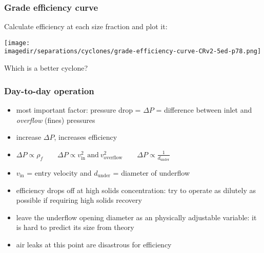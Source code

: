 \begin{frame}\frametitle{Grade efficiency curve}
	Calculate efficiency at each size fraction and plot it:
	\begin{center}
		\texttt{[image: \\imagedir/separations/cyclones/grade-efficiency-curve-CRv2-5ed-p78.png]}
	\end{center}
	Which is a better cyclone?
\end{frame}

\begin{frame}\frametitle{Day-to-day operation}
	\begin{itemize}
		\item	most important factor: pressure drop = $\Delta P$ = difference between inlet and \emph{overflow} (fines) pressures
		\item	increase $\Delta P$, increases efficiency
		\item	$\Delta P \propto \rho_f \qquad  \Delta P \propto v_\text{in}^2~\text{and}~v_\text{overflow}^2 \qquad  \Delta P \propto \displaystyle\frac{1}{d_\text{under}}$
		\item	$v_\text{in}$ = entry velocity and $d_\text{under}$ = diameter of underflow
		\item	efficiency drops off at high solids concentration: try to operate as dilutely as possible if requiring high solids recovery
		\item	leave the underflow opening diameter as an physically adjustable variable: it is hard to predict its size from theory
		\item	air leaks at this point are disastrous for efficiency 
	\end{itemize}
\end{frame}

